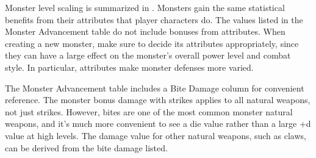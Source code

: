         Monster level scaling is summarized in .
        Monsters gain the same statistical benefits from their attributes that player characters do.
        The values listed in the Monster Advancement table do not include bonuses from attributes.
        When creating a new monster, make sure to decide its attributes appropriately, since they can have a large effect on the monster's overall power level and combat style.
        In particular, attributes make monster defenses more varied.

        The Monster Advancement table includes a Bite Damage column for convenient reference.
        The monster bonus damage with strikes applies to all natural weapons, not just strikes.
        However, bites are one of the most common monster natural weapons, and it's much more convenient to see a die value rather than a large +d value at high levels.
        The damage value for other natural weapons, such as claws, can be derived from the bite damage listed.

